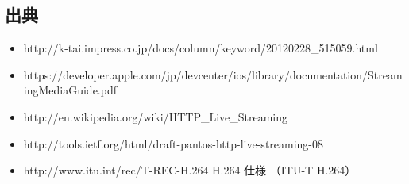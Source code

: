\subsection{出典}
\begin{itemize}
\item http://k-tai.impress.co.jp/docs/column/keyword/20120228\_515059.html
\item https://developer.apple.com/jp/devcenter/ios/library/documentation/StreamingMediaGuide.pdf
\item http://en.wikipedia.org/wiki/HTTP\_Live\_Streaming
\item http://tools.ietf.org/html/draft-pantos-http-live-streaming-08
\item http://www.itu.int/rec/T-REC-H.264 H.264 仕様 （ITU-T H.264）
\end{itemize}
